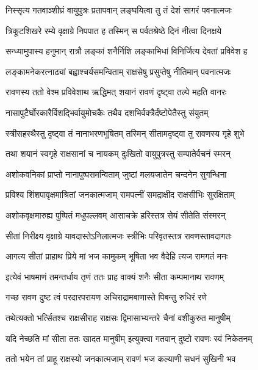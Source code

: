 \twolineshloka
{निस्सृत्य गतवाञ्शीघ्रं वायुपुत्रः प्रतापवान्}
{लङ्घयित्वा तु तं देशं सागरं पवनात्मजः} %

\twolineshloka
{त्रिकूटशिखरे रम्ये वृक्षाग्रे निपपात ह}
{तस्मिन् स पर्वतश्रेष्ठे दिनं नीत्वा दिनक्षये} %

\twolineshloka
{सन्ध्यामुपास्य हनुमान् रात्रौ लङ्कां शनैर्निशि}
{लङ्काभिधां विनिर्जित्य देवतां प्रविवेश ह} %

\twolineshloka
{लङ्कामनेकरत्नाढ्यां बह्वाश्चर्यसमन्विताम्}
{राक्षसेषु प्रसुप्तेषु नीतिमान् पवनात्मजः} %

\twolineshloka
{रावणस्य ततो वेश्म प्रविवेशाथ ऋद्धिमत्}
{शयानं रावणं दृष्ट्वा तल्पे महति वानरः} %

\twolineshloka
{नासापुटैर्घोरकारैर्विशद्भिर्वायुमोचकैः}
{तथैव दशभिर्वक्त्रैर्दंष्टोपेतैस्तु संयुतम्} %

\twolineshloka
{स्त्रीसहस्थैस्तु दृष्ट्वा तं नानाभरणभूषितम्}
{तस्मिन् सीतामदृष्ट्वा तु रावणस्य गृहे शुभे} %

\twolineshloka
{तथा शयानं स्वगृहे राक्षसानां च नायकम्}
{दुःखितो वायुपुत्रस्तु सम्पातेर्वचनं स्मरन्} %

\twolineshloka
{अशोकवनिकां प्राप्तो नानापुष्पसमन्विताम्}
{जुष्टां मलयजातेन चन्दनेन सुगन्धिना} %

\twolineshloka
{प्रविश्य शिंशपावृक्षमाश्रितां जनकात्मजाम्}
{रामपत्नीं समद्राक्षीद राक्षसीभिः सुरक्षिताम्} %

\twolineshloka
{अशोकवृक्षमारुह्य पुष्पितं मधुपल्लवम्}
{आसाचक्रे हरिस्तत्र सेयं सीतेति संस्मरन्} %

\twolineshloka
{सीतां निरीक्ष्य वृक्षाग्रे यावदास्तेऽनिलात्मजः}
{स्त्रीभिः परिवृतस्तत्र रावणस्तावदागतः} %

\twolineshloka
{आगत्य सीतां प्राहाथ प्रिये मां भज कामुकम्}
{भूषिता भव वैदेहि त्यज रामगतं मनः} %

\twolineshloka
{इत्येवं भाषमाणं तमन्तर्धाय तृणं ततः}
{प्राह वाक्यं शनैः सीता कम्पमानाथ रावणम्} %

\twolineshloka
{गच्छ रावण दुष्ट त्वं परदारपरायण}
{अचिराद्रामबाणास्ते पिबन्तु रुधिरं रणे} %

\twolineshloka
{तथेत्यक्तो भर्त्सितश्च राक्षसीराह राक्षसः}
{द्विमासाभ्यन्तरे चैनां वशीकुरुत मानुषीम्} %

\twolineshloka
{यदि नेच्छति मां सीता ततः खादत मानुषीम्}
{इत्युक्त्वा गतवान् दुष्टो रावणः स्वं निकेतनम्} %

\twolineshloka
{ततो भयेन तां प्राहू राक्षस्यो जनकात्मजाम्}
{रावणं भज कल्याणी सधनं सुखिनी भव} %

